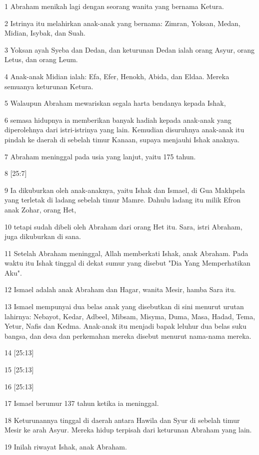 \par 1 Abraham menikah lagi dengan seorang wanita yang bernama Ketura.
\par 2 Istrinya itu melahirkan anak-anak yang bernama: Zimran, Yoksan, Medan, Midian, Isybak, dan Suah.
\par 3 Yoksan ayah Syeba dan Dedan, dan keturunan Dedan ialah orang Asyur, orang Letus, dan orang Leum.
\par 4 Anak-anak Midian ialah: Efa, Efer, Henokh, Abida, dan Eldaa. Mereka semuanya keturunan Ketura.
\par 5 Walaupun Abraham mewariskan segala harta bendanya kepada Ishak,
\par 6 semasa hidupnya ia memberikan banyak hadiah kepada anak-anak yang diperolehnya dari istri-istrinya yang lain. Kemudian disuruhnya anak-anak itu pindah ke daerah di sebelah timur Kanaan, supaya menjauhi Ishak anaknya.
\par 7 Abraham meninggal pada usia yang lanjut, yaitu 175 tahun.
\par 8 [25:7]
\par 9 Ia dikuburkan oleh anak-anaknya, yaitu Ishak dan Ismael, di Gua Makhpela yang terletak di ladang sebelah timur Mamre. Dahulu ladang itu milik Efron anak Zohar, orang Het,
\par 10 tetapi sudah dibeli oleh Abraham dari orang Het itu. Sara, istri Abraham, juga dikuburkan di sana.
\par 11 Setelah Abraham meninggal, Allah memberkati Ishak, anak Abraham. Pada waktu itu Ishak tinggal di dekat sumur yang disebut "Dia Yang Memperhatikan Aku".
\par 12 Ismael adalah anak Abraham dan Hagar, wanita Mesir, hamba Sara itu.
\par 13 Ismael mempunyai dua belas anak yang disebutkan di sini menurut urutan lahirnya: Nebayot, Kedar, Adbeel, Mibsam, Misyma, Duma, Masa, Hadad, Tema, Yetur, Nafis dan Kedma. Anak-anak itu menjadi bapak leluhur dua belas suku bangsa, dan desa dan perkemahan mereka disebut menurut nama-nama mereka.
\par 14 [25:13]
\par 15 [25:13]
\par 16 [25:13]
\par 17 Ismael berumur 137 tahun ketika ia meninggal.
\par 18 Keturunannya tinggal di daerah antara Hawila dan Syur di sebelah timur Mesir ke arah Asyur. Mereka hidup terpisah dari keturunan Abraham yang lain.
\par 19 Inilah riwayat Ishak, anak Abraham.
